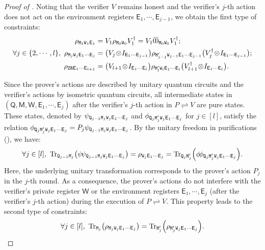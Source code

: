 \documentclass[10pt,a4paper]{article}
\numberwithin{equation}{section}
\numberwithin{figure}{section}
\newcommand{\protocol}[2]{{#1}\!\rightleftharpoons\!{#2}}
\DeclarePairedDelimiter\rbra{\lparen}{\rparen}
\let\ket\relax\DeclarePairedDelimiter\ket{\lvert}{\rangle}
\let\bra\relax\DeclarePairedDelimiter\bra{\langle}{\rvert}
\newcommand{\ketbra}[2]{\ensuremath{\ket{#1}\!\bra{#2}}}
\newcommand{\Tr}{\mathrm{Tr}}
\newcommand{\sfE}{\mathsf{E}}
\newcommand{\sfM}{\mathsf{M}}
\newcommand{\sfQ}{\mathsf{Q}}
\newcommand{\sfW}{\mathsf{W}}
\newcommand{\ttM}{\mathtt{M}}
\newcommand{\ttQ}{\mathtt{Q}}
\newcommand{\ttR}{\mathtt{R}}
\newcommand{\ttW}{\mathtt{W}}
\newcommand{\ttZ}{\mathtt{Z}}
\begin{document}
\begin{proof}[Proof of ]
    Noting that the verifier $V$ remains honest and the verifier's $j$-th action does not act on the environment registers $\sfE_1,\cdots,\sfE_{j-1}$, we obtain the first type of constraints:
    \begin{equation}
        \label{eq:QIPUL-honest-verifier-cond}
        \begin{aligned}
            \rho_{\ttM_1\ttW_1\sfE_1} &= V_1 \rho_{\ttM_{0}\ttW_{0}} V_1^{\dagger} = V_1 \ketbra{\bar{0}}{\bar{0}}_{\ttM_0\ttW_0} V_1^{\dagger};\\
        \forall j \in \{2,\cdots,l\},~\rho_{\ttM_j\ttW_j\sfE_1\cdots\sfE_j} &= \big(V_j \!\otimes\! I_{\sfE_1\cdots\sfE_{j-1}} \big) \rho_{\ttM'_{j-1}\ttW_{j-1}\sfE_1\cdots\sfE_{j-1}} \big( V_j^{\dagger} \!\otimes\! I_{\sfE_1\cdots\sfE_{j-1}}  \big);\\
        \rho_{\ttZ\ttR\sfE_1\cdots\sfE_{l+1}} &= \big( V_{l+1} \!\otimes\! I_{\sfE_1\cdots\sfE_l} \big) \rho_{\ttM'_l\ttW_l\sfE_1\cdots\sfE_l} \big(V_{l+1}^{\dagger} \!\otimes\! I_{\sfE_1\cdots\sfE_l} \big).
        \end{aligned}
    \end{equation}

    Since the prover's actions are described by unitary quantum circuits and the verifier's actions by isometric quantum circuits, all intermediate states in $(\sfQ, \sfM, \sfW, \sfE_1, \cdots, \sfE_j)$ after the verifier's $j$-th action in $\protocol{P}{V}$ are pure states. These states, denoted by $\ket{\psi}_{\ttQ_{j-1}\ttM_j\ttW_j\sfE_1\cdots\sfE_j}$ and $\ket{\phi}_{\ttQ_{j}\ttM'_j\ttW_j\sfE_1\cdots\sfE_j}$ for $j \in [l]$, satisfy the relation
    $\ket{\phi}_{\ttQ_{j}\ttM'_j\ttW_j\sfE_1\cdots\sfE_j} = P_j \ket{\psi}_{\ttQ_{j-1}\ttM_j\ttW_j\sfE_1\cdots\sfE_j}$.
    By the unitary freedom in purifications (), we have:
    \begin{equation*}
        \forall j \in [l],~\Tr_{\ttQ_{j-1}\ttM_j}\rbra*{\ketbra{\psi}{\psi}_{\ttQ_{j-1}\ttM_j\ttW_j\sfE_1\cdots\sfE_j}} = \rho_{\ttW_j\sfE_1\cdots\sfE_j} = \Tr_{\ttQ_{j}\ttM'_j}\rbra*{\ketbra{\phi}{\phi}_{\ttQ_{j}\ttM'_j\ttW_j\sfE_1\cdots\sfE_j}}.
    \end{equation*}
    Here, the underlying unitary transformation corresponds to the prover's action $P_j$ in the $j$-th round. 
    As a consequence, the prover's actions do not interfere with the verifier's private register $\sfW$ or the environment registers $\sfE_1, \cdots, \sfE_j$ (after the verifier's $j$-th action) during the execution of $\protocol{P}{V}$. 
    This property leads to the second type of constraints: 
    \begin{equation}
        \label{eq:QIPUL-prover-actions-cond}
        \forall j \in [l],~\Tr_{\ttM_j}\rbra*{\rho_{\ttM_j\ttW_j\sfE_1\cdots\sfE_j}} = \Tr_{\ttM'_j}\rbra*{\rho_{\ttM'_j\ttW_j\sfE_1\cdots\sfE_j}}.
    \end{equation}


\end{proof}
\end{document}
